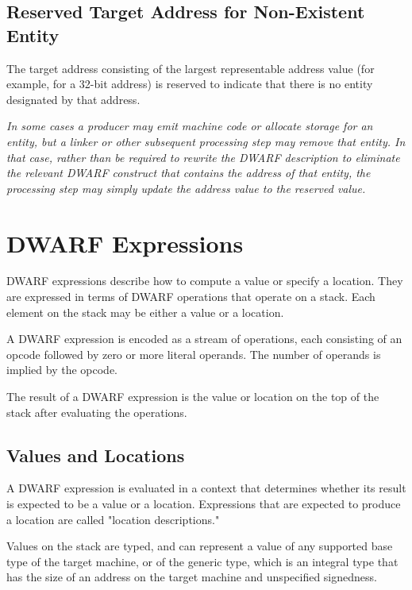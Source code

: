 \bb
{}
\subsection{Reserved Target Address for Non-Existent Entity}
\label{chap:reservedtargetaddress}
The target address consisting of the largest representable address
value (for example, \xffffffff{} for a 32-bit address) is reserved to
indicate that there is no entity designated by that address.

\textit{In some cases a producer may emit machine code or allocate
storage for an entity, but a linker or other subsequent processing
step may remove that entity. In that case, rather than be required
to rewrite the DWARF description to eliminate the relevant DWARF
construct that contains the address of that entity, the processing
step may simply update the address value to the reserved value.}
\eb

\section{DWARF Expressions}
\label{chap:dwarfexpressions}

DWARF expressions describe how to compute a value or specify a
location. They are expressed in terms of DWARF operations that operate
on a stack. Each element on the stack may be either a value or a
location.

A DWARF expression is encoded as a stream of operations, each
consisting of an opcode followed by zero or more literal operands. The
number of operands is implied by the opcode.

The result of a DWARF expression is the value or location on the top
of the stack after evaluating the operations.

\subsection{Values and Locations}
A DWARF expression is evaluated in a context that determines whether
its result is expected to be a value or a location. Expressions that
are expected to produce a location are called "location descriptions."

Values on the stack are typed, and can represent a value of any
supported base type of the target machine, or of the generic type,
which is an integral type that has the size of an address on the
target machine and unspecified signedness.

